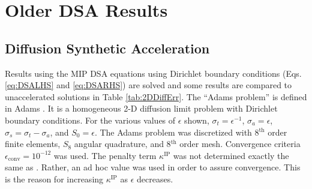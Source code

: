 \documentclass{article}
\begin{document}
\section{Older DSA Results}

\subsection{Diffusion Synthetic Acceleration}

Results using the MIP DSA equations using Dirichlet boundary conditions (Eqs. \ref{eq:DSALHS} and \ref{eq:DSARHS}) are solved and some results are compared to unaccelerated solutions in Table \ref{tab:2DDiffErr}. The ``Adams problem'' is defined in Adams \cite{Adams_Disc_FEM_Thick_Diff}. It is a homogeneous 2-D diffusion limit problem with Dirichlet boundary conditions. For the various values of $\epsilon$ shown, $\sigma_t = \epsilon^{-1}$, $\sigma_a = \epsilon$, $\sigma_s = \sigma_t - \sigma_a$, and $S_0 = \epsilon$. The Adams problem was discretized with 8$^\text{th}$ order finite elements, $S_8$ angular quadrature, and 8$^\text{th}$ order mesh. Convergence criteria $\epsilon_\text{conv} = 10^{-12}$ was used. The penalty term $\kappa^\text{IP}$ was not determined exactly the same as \cite{WangRagusaDSA}. Rather, an ad hoc value was used in order to assure convergence. This is the reason for increasing $\kappa^\text{IP}$ as $\epsilon$ decreases.
\end{document}
